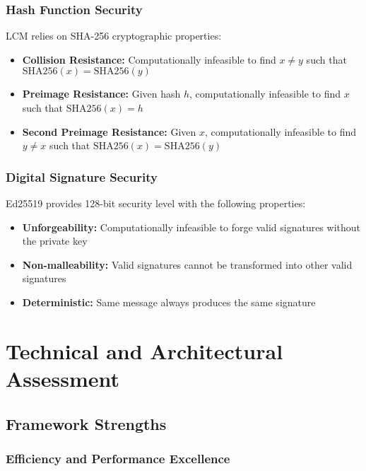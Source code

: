 \documentclass[12pt,a4paper]{article}
\begin{document}
\subsubsection{Hash Function Security}

LCM relies on SHA-256 cryptographic properties:

\begin{itemize}
\item \textbf{Collision Resistance:} Computationally infeasible to find $x \neq y$ such that $\text{SHA256}(x) = \text{SHA256}(y)$
\item \textbf{Preimage Resistance:} Given hash $h$, computationally infeasible to find $x$ such that $\text{SHA256}(x) = h$
\item \textbf{Second Preimage Resistance:} Given $x$, computationally infeasible to find $y \neq x$ such that $\text{SHA256}(x) = \text{SHA256}(y)$
\end{itemize}

\subsubsection{Digital Signature Security}

Ed25519 provides 128-bit security level with the following properties:

\begin{itemize}
\item \textbf{Unforgeability:} Computationally infeasible to forge valid signatures without the private key
\item \textbf{Non-malleability:} Valid signatures cannot be transformed into other valid signatures
\item \textbf{Deterministic:} Same message always produces the same signature
\end{itemize}

\section{Technical and Architectural Assessment}

\subsection{Framework Strengths}

\subsubsection{Efficiency and Performance Excellence}
\end{document}
